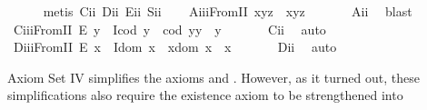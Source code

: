 \begin{isabellebody}
%
\isadelimproof
\ \ \ \ %
\endisadelimproof
%
\isatagproof
{}\isamarkupfalse%
\ {\isacharparenleft}metis\ C\isactrlsub i\isactrlsub i\ D\isactrlsub i\isactrlsub i\ E\isactrlsub i\isactrlsub i\ S\isactrlsub i\isactrlsub i{\isacharparenright}%
\endisatagproof
{\isafoldproof}%
%
\isadelimproof
\isanewline
%
\endisadelimproof
\ \ \isamarkupfalse%
\ A\isactrlsub i\isactrlsub i\isactrlsub iFromII{\isacharcolon}\ {\isachardoublequoteopen}x{\isasymcdot}{\isacharparenleft}y{\isasymcdot}z{\isacharparenright}\ {\isasymcong}\ {\isacharparenleft}x{\isasymcdot}y{\isacharparenright}{\isasymcdot}z{\isachardoublequoteclose}\ \isanewline
%
\isadelimproof
\ \ \ \ %
\endisadelimproof
%
\isatagproof
{}\isamarkupfalse%
\ A\isactrlsub i\isactrlsub i\ \isamarkupfalse%
\ blast%
\endisatagproof
{\isafoldproof}%
%
\isadelimproof
\isanewline
%
\endisadelimproof
\ \ \isamarkupfalse%
\ C\isactrlsub i\isactrlsub i\isactrlsub iFromII{\isacharcolon}\ {\isachardoublequoteopen}E\ y\ \isactrlbold {\isasymrightarrow}\ {\isacharparenleft}I{\isacharparenleft}cod\ y{\isacharparenright}\ \isactrlbold {\isasymand}\ {\isacharparenleft}cod\ y{\isacharparenright}{\isasymcdot}y\ {\isasymcong}\ y{\isacharparenright}{\isachardoublequoteclose}\ \isanewline
%
\isadelimproof
\ \ \ \ %
\endisadelimproof
%
\isatagproof
{}\isamarkupfalse%
\ C\isactrlsub i\isactrlsub i\ \isamarkupfalse%
\ auto%
\endisatagproof
{\isafoldproof}%
%
\isadelimproof
\isanewline
%
\endisadelimproof
\ \ \isamarkupfalse%
\ D\isactrlsub i\isactrlsub i\isactrlsub iFromII{\isacharcolon}\ {\isachardoublequoteopen}E\ x\ \isactrlbold {\isasymrightarrow}\ {\isacharparenleft}I{\isacharparenleft}dom\ x{\isacharparenright}\ \isactrlbold {\isasymand}\ x{\isasymcdot}{\isacharparenleft}dom\ x{\isacharparenright}\ {\isasymcong}\ x{\isacharparenright}{\isachardoublequoteclose}\ \isanewline
%
\isadelimproof
\ \ \ \ %
\endisadelimproof
%
\isatagproof
{}\isamarkupfalse%
\ D\isactrlsub i\isactrlsub i\ \isamarkupfalse%
\ auto%
\endisatagproof
{\isafoldproof}%
%
\isadelimproof
%
\endisadelimproof
%
\isamarkuptrue%
%
\begin{isamarkuptext}%
Axiom Set IV simplifies the axioms  and  . However, as it turned 
 out, these simplifications also require the existence axiom  to be strengthened into

\end{isamarkuptext}
\end{isabellebody}
